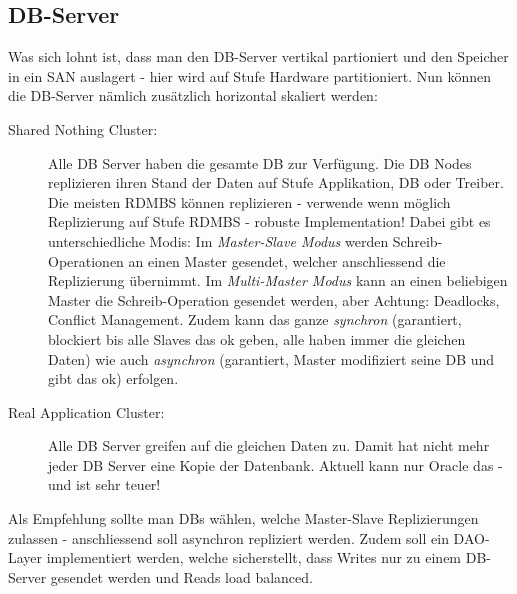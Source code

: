 \subsection{DB-Server}
Was sich lohnt ist, dass man den DB-Server vertikal partioniert und den Speicher in ein SAN auslagert - hier wird auf Stufe Hardware partitioniert. Nun können die DB-Server nämlich zusätzlich horizontal skaliert werden:
\begin{description}
	\item[Shared Nothing Cluster:] Alle DB Server haben die gesamte DB zur Verfügung. Die DB Nodes replizieren ihren Stand der Daten auf Stufe Applikation, DB oder Treiber. Die meisten RDMBS können replizieren - verwende wenn möglich Replizierung auf Stufe RDMBS - robuste Implementation! Dabei gibt es unterschiedliche Modis: Im \emph{Master-Slave Modus} werden Schreib-Operationen an einen Master gesendet, welcher anschliessend die Replizierung übernimmt. Im \emph{Multi-Master Modus} kann an einen beliebigen Master die Schreib-Operation gesendet werden, aber Achtung: Deadlocks, Conflict Management. Zudem kann das ganze \emph{synchron} (garantiert, blockiert bis alle Slaves das ok geben, alle haben immer die gleichen Daten) wie auch \emph{asynchron} (garantiert, Master modifiziert seine DB und gibt das ok) erfolgen.
	\item[Real Application Cluster:] Alle DB Server greifen auf die gleichen Daten zu. Damit hat nicht mehr jeder DB Server eine Kopie der Datenbank. Aktuell kann nur Oracle das - und ist sehr teuer!
\end{description}
Als Empfehlung sollte man DBs wählen, welche Master-Slave Replizierungen zulassen - anschliessend soll asynchron repliziert werden. Zudem soll ein DAO-Layer implementiert werden, welche sicherstellt, dass Writes nur zu einem DB-Server gesendet werden und Reads load balanced.


